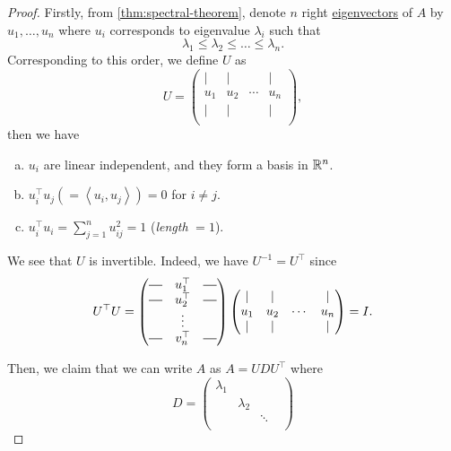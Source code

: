 \begin{proof}
	Firstly, from \autoref{thm:spectral-theorem}, denote \(n\) right \hyperref[def:eigenvector]{eigenvectors} of \(A\) by \(u_1, \ldots , u_n\) where \(u_{i} \) corresponds to eigenvalue \(\lambda _i\) such that
	\[
		\lambda _1 \leq \lambda _2 \leq \ldots  \leq \lambda _n.
	\]
	Corresponding to this order, we define \(U\) as
	\[
		U = \begin{pmatrix}
			\mid & \mid &        & \mid \\
			u_1  & u_2  & \cdots & u_n  \\
			\mid & \mid &        & \mid \\
		\end{pmatrix},
	\]
	then we have
	\begin{enumerate}[(a)]
		\item \(u_i\) are linear independent, and they form a basis in \(\mathbb{\MakeUppercase{r}} ^n\).
		\item \(u_{i} ^{\top} u_{j} ( = \left< u_{i} , u_{j}  \right> ) = 0\) for \(i\neq j\).
		\item \(u_{i} ^{\top} u_{i} = \sum_{j=1}^{n} u_{ij}^{2} = 1 \) (\emph{length} \(= 1\)).
	\end{enumerate}
	\begin{remark}[\(U\) is invertible]
		We see that \(U\) is invertible. Indeed, we have \(U^{-1} = U^{\top} \) since
		\[
			U^{\top}U = \begin{pmatrix}
				\horzbar & u^{\top}_1 & \horzbar \\
				\horzbar & u^{\top}_2 & \horzbar \\
				         & \vdots     &          \\
				\horzbar & v^{\top}_n & \horzbar \\
			\end{pmatrix}\begin{pmatrix}
				\mid & \mid &        & \mid \\
				u_1  & u_2  & \cdots & u_n  \\
				\mid & \mid &        & \mid \\
			\end{pmatrix} = I.
		\]
	\end{remark}
	Then, we claim that we can write \(A\) as \(A = U D U^{\top}\) where \[
		D  = \begin{pmatrix}
			\lambda_1 &           &        &           \\
			          & \lambda_2 &        &           \\
			          &           & \ddots &           \\

\end{pmatrix}\]
\end{proof}
